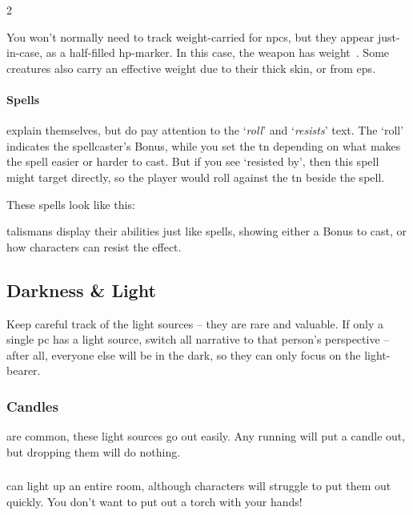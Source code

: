\begin{multicols}{2}
{  You won't normally need to track \gls{weight}-carried for \glspl{npc}, but they appear just-in-case, as a half-filled \gls{hp}-marker.
  In this case, the \gls{weapon} has \gls{weight}~.
  Some creatures also carry an effective \gls{weight} due to their thick skin, or from \glspl{ep}.

  \paragraph{Spells}
  explain themselves, but do pay attention to the `\textit{roll}' and `\textit{resists}' text.
  The `roll' indicates the spellcaster's Bonus, while you set the \gls{tn} depending on what makes the spell easier or harder to cast.
  But if you see `resisted by', then this spell might target  directly, so the player would roll against the \gls{tn} beside the spell.

  These spells look like this:

  \begin{exampletext}
    \showStdSpells
  \end{exampletext}

  \Glspl{talisman} display their abilities just like spells, showing either a Bonus to cast, or how characters can resist the effect.
}{}

\subsection{Darkness \& Light}

Keep careful track of the light sources -- they are rare and valuable.
If only a single \gls{pc} has a light source, switch all narrative to that person's perspective -- after all, everyone else will be in the dark, so they can only focus on the light-bearer.%

\subsubsection{Candles}
are common, these light sources go out easily.
Any running will put a candle out, but dropping them will do nothing.

\subsubsection{}
can light up an entire room, although characters will struggle to put them out quickly.
You don't want to put out a torch with your hands!


\end{multicols}
